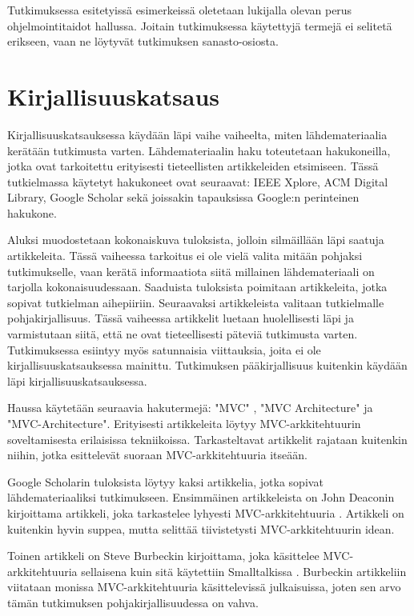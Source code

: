 \documentclass[finnish,utf8,nonumbib,palatino,kandi]{gradu2}
\begin{document}
Tutkimuksessa esitetyissä esimerkeissä oletetaan lukijalla olevan perus ohjelmointitaidot hallussa. Joitain tutkimuksessa käytettyjä termejä ei selitetä erikseen, vaan ne löytyvät tutkimuksen sanasto-osiosta.

\section{Kirjallisuuskatsaus}
Kirjallisuuskatsauksessa käydään läpi vaihe vaiheelta, miten lähdemateriaalia kerätään
tutkimusta varten. Lähdemateriaalin haku toteutetaan hakukoneilla, jotka ovat tarkoitettu
erityisesti tieteellisten artikkeleiden etsimiseen. Tässä tutkielmassa käytetyt hakukoneet ovat seuraavat:
IEEE Xplore, ACM Digital Library, Google Scholar sekä joissakin tapauksissa Google:n perinteinen hakukone.

Aluksi muodostetaan kokonaiskuva tuloksista, jolloin silmäillään läpi saatuja artikkeleita. Tässä
vaiheessa tarkoitus ei ole vielä valita mitään pohjaksi tutkimukselle, vaan kerätä informaatiota
siitä millainen lähdemateriaali on tarjolla kokonaisuudessaan. Saaduista tuloksista poimitaan artikkeleita,
jotka sopivat tutkielman aihepiiriin. Seuraavaksi artikkeleista valitaan tutkielmalle pohjakirjallisuus. Tässä vaiheessa artikkelit luetaan huolellisesti
läpi ja varmistutaan siitä, että ne ovat tieteellisesti päteviä tutkimusta varten. Tutkimuksessa esiintyy myös
satunnaisia viittauksia, joita ei ole kirjallisuuskatsauksessa mainittu. Tutkimuksen pääkirjallisuus kuitenkin käydään läpi kirjallisuuskatsauksessa.

Haussa käytetään seuraavia hakutermejä: "MVC" , "MVC Architecture" ja "MVC-Architecture".  Erityisesti
artikkeleita löytyy MVC-arkkitehtuurin soveltamisesta erilaisissa tekniikoissa. Tarkasteltavat artikkelit rajataan kuitenkin niihin, jotka esittelevät suoraan MVC-arkkitehtuuria itseään.

Google Scholarin tuloksista löytyy kaksi artikkelia, jotka sopivat
lähdemateriaaliksi tutkimukseen. Ensimmäinen artikkeleista on John Deaconin kirjoittama artikkeli, joka
tarkastelee lyhyesti MVC-arkkitehtuuria \cite{Deacon:1995}. Artikkeli on kuitenkin hyvin suppea, mutta
selittää tiivistetysti MVC-arkkitehtuurin idean.

Toinen artikkeli on Steve Burbeckin kirjoittama, joka käsittelee MVC-arkkitehtuuria sellaisena kuin
sitä käytettiin Smalltalkissa \cite{Burbeck}. Burbeckin artikkeliin viitataan
monissa MVC-arkkitehtuuria käsittelevissä julkaisuissa, joten sen arvo tämän tutkimuksen pohjakirjallisuudessa on vahva.
\end{document}
